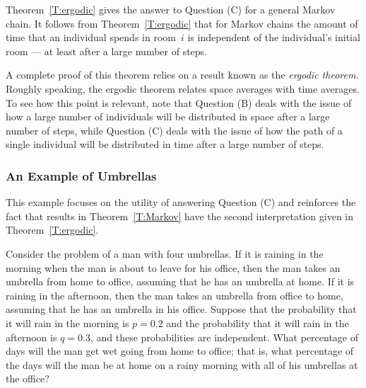 \documentclass{ximera}
\begin{document}
Theorem~\ref{T:ergodic} gives the answer to Question (C) for a general Markov
chain.  It follows from Theorem~\ref{T:ergodic} that for Markov chains the
amount of time that an individual spends in room~$i$ is independent of the
individual's initial room --- at least after a large number of steps.

A complete proof of this theorem relies on a result known as the {\em ergodic
theorem}.
Roughly speaking, the ergodic theorem relates space averages
with time averages.   To see how this point is relevant, note that Question (B)
deals with the issue of how a large number of individuals will be distributed
in space after a large number of steps, while Question (C) deals with the
issue of how the path of a single individual will be distributed in time after
a large number of steps.

\subsubsection*{An Example of Umbrellas}

This example focuses on the utility of answering Question (C) and reinforces
the fact that results in Theorem~\ref{T:Markov} have the second
interpretation given in Theorem~\ref{T:ergodic}.

Consider the problem of a man with four umbrellas.  If it is raining in the
morning when the man is about to leave for his office, then the man takes an
umbrella from home to office, assuming that he has an umbrella at home.  If it
is raining in the afternoon, then the man takes an umbrella from office to
home, assuming that he has an umbrella in his office.  Suppose that the
probability that it will rain in the morning is $p=0.2$ and the probability
that it will rain in the afternoon is $q=0.3$, and these probabilities are
independent.  What percentage of days will the man get wet going from home
to office; that is, what percentage of the days will the man be at home on a
rainy morning with all of his umbrellas at the office?
\end{document}
